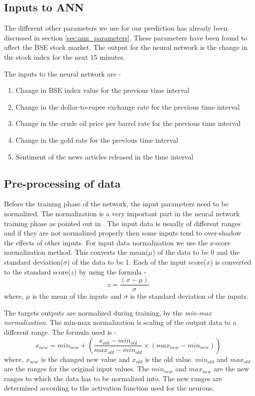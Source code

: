 \documentclass[a4paper,12bp]{report}
\begin{document}
\subsection{Inputs to ANN}

The different other parameters we use for our prediction has already been discussed in section \ref{sec:ann_parameters}. These parameters have been found to affect the BSE stock market. The output for the neural network is the change in the stock index for the next 15 minutes. 

The inputs to the neural network are - 
\begin{enumerate}
\item Change in BSE index value for the previous time interval
\item Change in the dollar-to-rupee exchange rate for the previous time interval
\item Change in the crude oil price per barrel rate for the previous time interval
\item Change in the gold rate for the previous time interval
\item Sentiment of the news articles released in the time interval
\end{enumerate}

\subsection{Pre-processing of data}
Before the training phase of the network, the input parameters need to be normalized. The normalization is a very important part in the neural network training phase as pointed out in \cite{Basheer:2000}. The input data is usually of different ranges and if they are not normalized properly then some inputs tend to over-shadow the effects of other inputs. For input data normalization we use the z-score normalization method. This converts the mean($\mu$) of the data to be 0 and the standard deviation($\sigma$) of the data to be 1. Each of the input score($x$) is converted to the standard score($z$) by using the formula -
\begin{equation}
z = \frac{(x - \mu)}{\sigma}
\end{equation}
where, $\mu$ is the mean of the inputs and $\sigma$ is the standard deviation of the inputs. 

The targets outputs are normalized during training, by the \textit{min-max normalization}. The min-max normalization is scaling of the output data to a different range. The formula used is - 
\begin{equation}
x_{new} = min_{new} + \left(\frac{x_{old} - min_{old}}{max_{old} - min_{old}} \times (max_{new} - min_{new})\right)
\end{equation}
where, $x_{new}$ is the changed new value and $x_{old}$ is the old value. $min_{old}$ and $max_{old}$ are the ranges for the original input values. The $min_{new}$ and $max_{new}$ are the new ranges to which the data has to be normalized into.  The new ranges are determined according to the activation function used for the neurons. 
\end{document}
